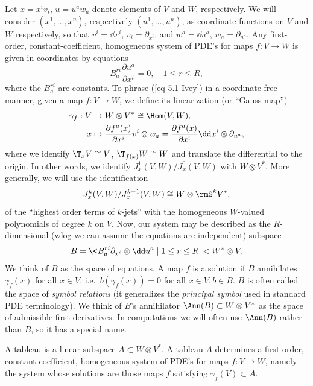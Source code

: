 Let $x=x^iv_i$, $u=u^aw_a$ denote elements of $V$ and $W$, respectively. We will consider $(x^1,\ldots,x^n)$, respectively $(u^1,\ldots,u^n)$, as coordinate functions on $V$ and $W$ respectively, so that $v^i=\dd x^i$, $v_i=\partial_{x^i}$, and $w^a=\dd u^a$, $w_a=\partial_{u^a}$. Any first-order, constant-coefficient, homogeneous system of PDE's for maps $f:V\to W$ is given in coordinates by equations
\[B_a^{ri}\frac{\partial u^a}{\partial x^i}=0,\quad 1\leq r\leq R,\label{eq 5.1 Ivey}\]
where the $B_a^{ri}$ are constants. 
To phrase (\ref{eq 5.1 Ivey}) in a coordinate-free manner, given a map $f:V\to W$, we define its linearization (or ``Gauss map'')
\begin{align}
    \gamma_f:V &\to W\otimes V^\ast\cong \Hom(V,W),\\
    x&\mapsto \frac{\partial f^a(x)}{\partial x^i}v^i\otimes w_a=\frac{\partial f^a(x)}{\partial x^i} \dd x^i\otimes \partial_{u^a},
\end{align}
where we identify $\T_xV\cong V$, $\T_{f(x)}W\cong W$ and translate the differential to the origin. In other words, we identify $J^1_x(V,W)\slash J^0_x(V,W)$ with $W\otimes V^\ast$. More generally, we will use the identification
\[J^k_x(V,W)\slash J^{k-1}_x(V,W)\cong W\otimes \rmS^k V^\ast,\]
of the ``highest order terms of $k$-jets'' with the homogeneous $W$-valued polynomials of degree $k$ on $V$. Now, our system may be described as the $R$-dimensional (\gls{wlog} we can assume the equations are independent) subspace
\[B=\<B_a^{ri}\partial_{x^i}\otimes\dd u^a\mid 1\leq r\leq R\> < W^\ast\otimes V.\]
We think of $B$ as the space of equations. A map $f$ is a solution if $B$ annihilates $\gamma_f(x)$ for all $x\in V$, i.e.\ $b(\gamma_f(x))=0$ for all $x\in V,b\in B$.
$B$ is often called the space of \emph{symbol relations} (it generalizes the \emph{principal symbol} used in standard PDE terminology). We think of $B$'s annihilator $\Ann(B)\subset W\otimes V^\ast$ as the space of admissible first derivatives. In computations we will often use $\Ann(B)$ rather than $B$, so it has a special name.

\begin{defn}[Tableau]
    A tableau is a linear subspace $A\subset W\otimes V^\ast$. A tableau $A$ determines a first-order, constant-coefficient, homogeneous system of PDE's for maps $f:V\to W$, namely the system whose solutions are those maps $f$ satisfying $\gamma_f(V)\subset A$.
\end{defn}

